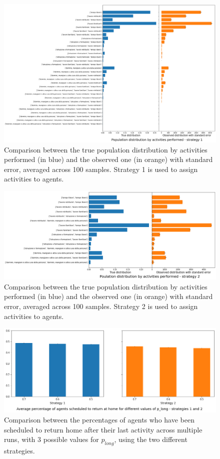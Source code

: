 \begin{figure}[H]
    \centering
    \includegraphics[scale = 0.35]{tex/pics/pop_by_act.png}
    \caption{Comparison between the true population distribution by activities performed (in blue) and the observed one (in orange) with standard error, averaged across 100 samples. Strategy 1 is used to assign activities to agents.}
    \label{pop_act}
\end{figure}

\begin{figure}[H]
    \centering
    \includegraphics[scale = 0.4]{tex/pics/pop_by_act2.png}
    \caption{Comparison between the true population distribution by activities performed (in blue) and the observed one (in orange) with standard error, averaged across 100 samples. Strategy 2 is used to assign activities to agents.}
    \label{pop_act2}
\end{figure}

\begin{figure}[H]
    \centering
    \includegraphics[scale = 0.4]{tex/pics/p_long_as.png}
    \caption{Comparison between the percentages of agents who have been scheduled to return home after their last activity across multiple runs, with 3 possible values for $p_{long}$, using the two different strategies.}
    \label{p_long_as}
\end{figure}

